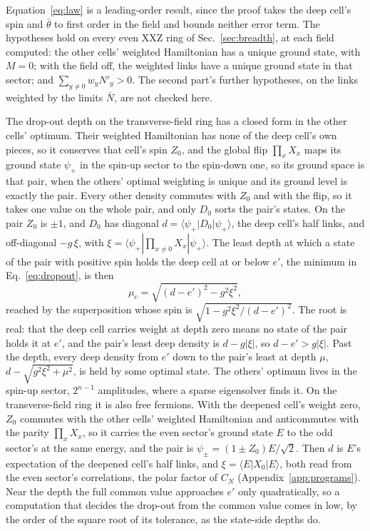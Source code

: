 \documentclass[aps,prd,reprint,superscriptaddress]{revtex4-2}
\begin{document}
Equation~\eqref{eq:law} is a leading-order result, since the proof takes the deep cell's spin and $\bar\theta$ to first order in the field and bounds neither error term. The hypotheses hold on every even XXZ ring of Sec.~\ref{sec:breadth}, at each field computed: the other cells' weighted Hamiltonian has a unique ground state, with $M = 0$; with the field off, the weighted links have a unique ground state in that sector; and $\sum_{y\neq0} w_y N'_y > 0$. The second part's further hypotheses, on the links weighted by the limits $\bar N$, are not checked here.

The drop-out depth on the transverse-field ring has a closed form in the other cells' optimum. Their weighted Hamiltonian has none of the deep cell's own pieces, so it conserves that cell's spin $Z_0$, and the global flip $\prod_x X_x$ maps its ground state $\psi_+$ in the spin-up sector to the spin-down one, so its ground space is that pair, when the others' optimal weighting is unique and its ground level is exactly the pair. Every other density commutes with $Z_0$ and with the flip, so it takes one value on the whole pair, and only $D_0$ sorts the pair's states. On the pair $Z_0$ is $\pm 1$, and $D_0$ has diagonal $d = \langle\psi_+|D_0|\psi_+\rangle$, the deep cell's half links, and off-diagonal $-g\,\xi$, with $\xi = \langle\psi_+|\prod_{x \neq 0} X_x|\psi_+\rangle$. The least depth at which a state of the pair with positive spin holds the deep cell at or below $e'$, the minimum in Eq.~\eqref{eq:dropout}, is then
\begin{equation}
  \mu_c = \sqrt{(d - e')^2 - g^2 \xi^2},
  \label{eq:depth}
\end{equation}
reached by the superposition whose spin is $\sqrt{1 - g^2 \xi^2/(d - e')^2}$. The root is real: that the deep cell carries weight at depth zero means no state of the pair holds it at $e'$, and the pair's least deep density is $d - g|\xi|$, so $d - e' > g|\xi|$. Past the depth, every deep density from $e'$ down to the pair's least at depth $\mu$, $d - \sqrt{g^2\xi^2 + \mu^2}$, is held by some optimal state. The others' optimum lives in the spin-up sector, $2^{n-1}$ amplitudes, where a sparse eigensolver finds it. On the transverse-field ring it is also free fermions. With the deepened cell's weight zero, $Z_0$ commutes with the other cells' weighted Hamiltonian and anticommutes with the parity $\prod_x X_x$, so it carries the even sector's ground state $E$ to the odd sector's at the same energy, and the pair is $\psi_\pm = (1 \pm Z_0)E/\sqrt 2$. Then $d$ is $E$'s expectation of the deepened cell's half links, and $\xi = \langle E|X_0|E\rangle$, both read from the even sector's correlations, the polar factor of $C_N$ (Appendix~\ref{app:programs}). Near the depth the full common value approaches $e'$ only quadratically, so a computation that decides the drop-out from the common value comes in low, by the order of the square root of its tolerance, as the state-side depths do.
\end{document}
